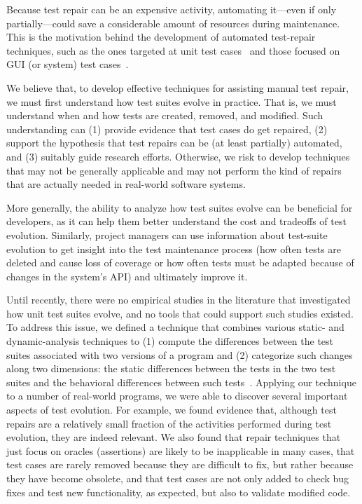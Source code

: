 \documentclass[conference]{IEEEtran}
\begin{document}
Because test repair can be an expensive activity, automating it---even
if only partially---could save a considerable amount of resources
during maintenance. This is the motivation behind the development of
automated test-repair techniques, such as the ones targeted at unit
test cases~\cite{Daniel:2009, Daniel:2010, Mirzaaghaei:2012} and those
focused on GUI (or system) test cases~\cite{Choudhary:2011,
  Grechanik:2009, Huang:2010, Memon:2008}.

We believe that, to develop effective techniques for assisting manual
test repair, we must first understand how test suites evolve in
practice.  That is, we must understand when and how tests are created,
removed, and modified. Such understanding can (1) provide evidence
that test cases do get repaired, (2) support the hypothesis that test
repairs can be (at least partially) automated, and (3) suitably guide
research efforts.  Otherwise, we risk to develop techniques that may
not be generally applicable and may not perform the kind of repairs
that are actually needed in real-world software systems.

More generally, the ability to analyze how test suites evolve can be
beneficial for developers, as it can help them better understand the
cost and tradeoffs of test evolution. Similarly, project managers can
use information about test-suite evolution to get insight into the
test maintenance process (\eg how often tests are deleted and cause
loss of coverage or how often tests must be adapted because of changes
in the system's API) and ultimately improve it.

Until recently, there were no empirical studies in the literature that
investigated how unit test suites evolve, and no tools that could
support such studies existed. To address this issue, we defined a
technique that combines various static- and dynamic-analysis
techniques to (1) compute the differences between the test suites
associated with two versions of a program and (2) categorize such
changes along two dimensions: the static differences between the tests
in the two test suites and the behavioral differences between such
tests~\cite{pinto12}. Applying our technique to a number of real-world
programs, we were able to discover several important aspects of test
evolution. For example, we found evidence that, although test repairs
are a relatively small fraction of the activities performed during
test evolution, they are indeed relevant.  We also found that repair
techniques that just focus on oracles (\ie assertions) are likely to
be inapplicable in many cases, that test cases are rarely removed
because they are difficult to fix, but rather because they have become
obsolete, and that test cases are not only added to check bug fixes
and test new functionality, as expected, but also to validate modified
code.
\end{document}
